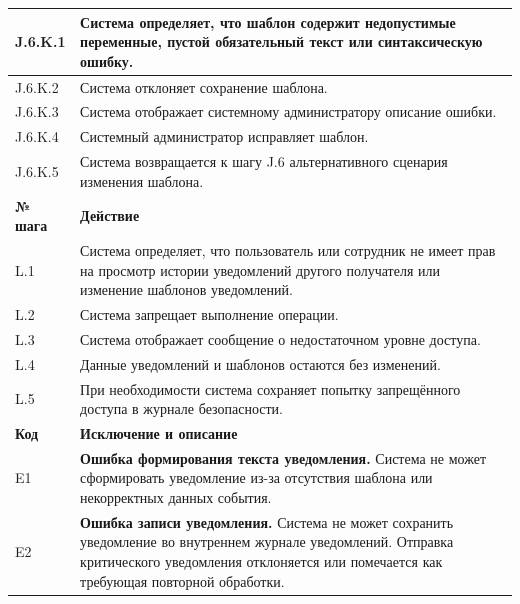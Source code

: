 \documentclass[12pt,a4paper]{article}
\begin{document}
\begin{xltabular}{\textwidth}{
				|>{\raggedright\arraybackslash}p{2.7cm}
				|>{\raggedright\arraybackslash}X|
			}
			J.6.K.1 & Система определяет, что шаблон содержит недопустимые переменные,
			пустой обязательный текст или синтаксическую ошибку. \\
			\hline
			J.6.K.2 & Система отклоняет сохранение шаблона. \\
			\hline
			J.6.K.3 & Система отображает системному администратору описание ошибки. \\
			\hline
			J.6.K.4 & Системный администратор исправляет шаблон. \\
			\hline
			J.6.K.5 & Система возвращается к шагу J.6 альтернативного сценария изменения
			шаблона. \\
			\hline
			
			
			\textbf{№ шага} & \textbf{Действие} \\
			\hline
			
			L.1 & Система определяет, что пользователь или сотрудник не имеет прав на
			просмотр истории уведомлений другого получателя или изменение
			шаблонов уведомлений. \\
			\hline
			L.2 & Система запрещает выполнение операции. \\
			\hline
			L.3 & Система отображает сообщение о недостаточном уровне доступа. \\
			\hline
			L.4 & Данные уведомлений и шаблонов остаются без изменений. \\
			\hline
			L.5 & При необходимости система сохраняет попытку запрещённого доступа в
			журнале безопасности. \\
			\hline
			
			
			\textbf{Код} & \textbf{Исключение и описание} \\
			\hline
			
			E1 &
			\textbf{Ошибка формирования текста уведомления.}
			Система не может сформировать уведомление из-за отсутствия шаблона
			или некорректных данных события. \\
			\hline
			
			E2 &
			\textbf{Ошибка записи уведомления.}
			Система не может сохранить уведомление во внутреннем журнале
			уведомлений. Отправка критического уведомления отклоняется или
			помечается как требующая повторной обработки. \\
			\hline
			

\end{xltabular}
\end{document}
